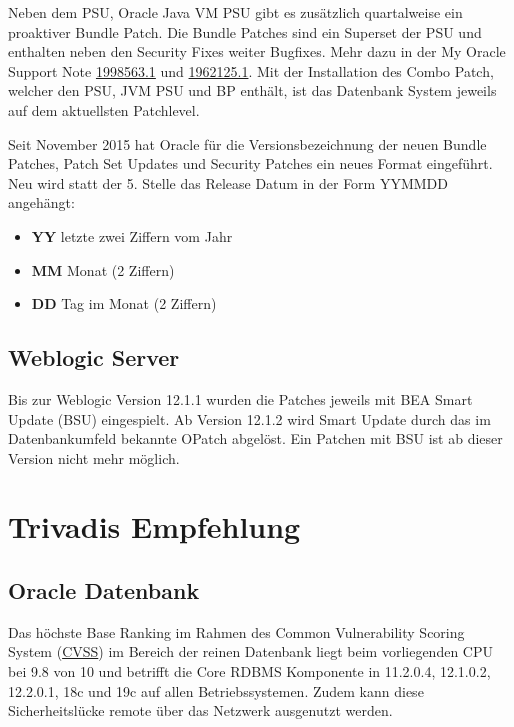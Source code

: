 Neben dem PSU, Oracle Java VM PSU gibt es zusätzlich quartalweise ein
proaktiver Bundle Patch. Die Bundle Patches sind ein Superset der PSU
und enthalten neben den Security Fixes weiter Bugfixes. Mehr dazu in der
My Oracle Support Note
\href{https://support.oracle.com/epmos/faces/DocumentDisplay?id=1998563.1}{1998563.1}
und
\href{https://support.oracle.com/epmos/faces/DocumentDisplay?id=1962125.1}{1962125.1}.
Mit der Installation des Combo Patch, welcher den PSU, JVM PSU und BP
enthält, ist das Datenbank System jeweils auf dem aktuellsten
Patchlevel.

Seit November 2015 hat Oracle für die Versionsbezeichnung der neuen
Bundle Patches, Patch Set Updates und Security Patches ein neues Format
eingeführt. Neu wird statt der 5. Stelle das Release Datum in der Form
YYMMDD angehängt:

\begin{itemize}
\tightlist
\item
  \textbf{YY} letzte zwei Ziffern vom Jahr
\item
  \textbf{MM} Monat (2 Ziffern)
\item
  \textbf{DD} Tag im Monat (2 Ziffern)
\end{itemize}

\hypertarget{weblogic-server}{%
\subsection{Weblogic Server}\label{weblogic-server}}

Bis zur Weblogic Version 12.1.1 wurden die Patches jeweils mit BEA Smart
Update (BSU) eingespielt. Ab Version 12.1.2 wird Smart Update durch das
im Datenbankumfeld bekannte OPatch abgelöst. Ein Patchen mit BSU ist ab
dieser Version nicht mehr möglich.

\hypertarget{trivadis-empfehlung}{%
\section{Trivadis Empfehlung}\label{trivadis-empfehlung}}

\hypertarget{oracle-datenbank}{%
\subsection{Oracle Datenbank}\label{oracle-datenbank}}

Das höchste Base Ranking im Rahmen des Common Vulnerability Scoring
System (\href{http://www.first.org/cvss/}{CVSS}) im Bereich der reinen
Datenbank liegt beim vorliegenden CPU bei 9.8 von 10 und betrifft die
Core RDBMS Komponente in 11.2.0.4, 12.1.0.2, 12.2.0.1, 18c und 19c auf
allen Betriebssystemen. Zudem kann diese Sicherheitslücke remote über
das Netzwerk ausgenutzt werden.

